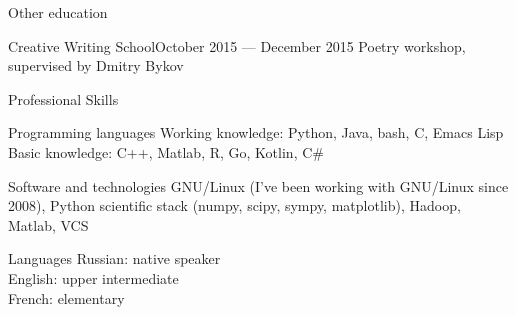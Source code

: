 \documentclass{resume}
\begin{document}
\begin{rSection}{Other education}
  \begin{rSubsection}{Creative Writing School}{October 2015 --- December 2015}{}
    Poetry workshop, supervised by Dmitry Bykov
  \end{rSubsection}
\end{rSection}

\begin{rSection}{Professional Skills}
  \begin{rSubsection}{Programming languages}{}{}
    Working knowledge: Python, Java, bash, C, Emacs Lisp \\
    Basic knowledge: C++, Matlab, R, Go, Kotlin, C\#
  \end{rSubsection}

  \begin{rSubsection}{Software and technologies}{}{}
    GNU/Linux (I've been working with GNU/Linux since 2008), Python scientific stack (numpy, scipy, sympy, matplotlib), Hadoop, Matlab, VCS
  \end{rSubsection}

  \begin{rSubsection}{Languages}{}{}
    Russian: native speaker \\
    English: upper intermediate \\
    French: elementary
  \end{rSubsection}
\end{rSection}
\end{document}
